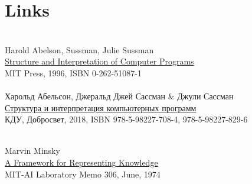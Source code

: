 
\chapter*{Links}
\clearpage

\begingroup
\renewcommand{\chapter}[2]{}
\begin{thebibliography}{}

  \\
Harold Abelson, Sussman, Julie Sussman \\
\href{https://mitpress.mit.edu/sites/default/files/sicp/full-text/book/book.html}{Structure and Interpretation of Computer Programs} \\
MIT Press, 1996, ISBN 0-262-51087-1 \\

  \\
Харольд Абельсон, Джеральд Джей Сассман \& Джули Сассман \\
\href{https://www.ozon.ru/context/detail/id/5322055/}{Структура и интерпретация компьютерных программ} \\
КДУ, Добросвет, 2018, ISBN 978-5-98227-708-4, 978-5-98227-829-6

 \ \\
Marvin Minsky \\
\href{https://web.media.mit.edu/~minsky/papers/Frames/frames.html}{A Framework for Representing Knowledge} \\
MIT-AI Laboratory Memo 306, June, 1974

\end{thebibliography}
\endgroup

\secup
